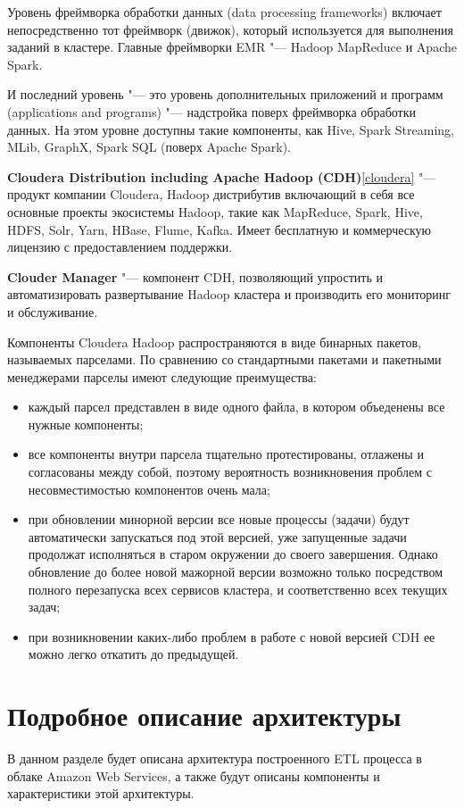 \documentclass[bachelor, och, pract]{SCWorks}
\begin{document}
Уровень фреймворка обработки данных (data processing frameworks) включает непосредственно тот фреймворк (движок), который используется для выполнения заданий в кластере. Главные фреймворки EMR "--- Hadoop MapReduce и Apache Spark.

И последний уровень "--- это уровень дополнительных приложений и программ (applications and programs) "--- надстройка поверх фреймворка обработки данных. На этом уровне доступны такие компоненты, как Hive, Spark Streaming, MLib, GraphX, Spark SQL (поверх Apache Spark).

\textbf{Cloudera Distribution including Apache Hadoop (CDH)}\ref{cloudera} "--- продукт компании Cloudera, Hadoop дистрибутив включающий в себя все основные проекты экосистемы Hadoop, такие как MapReduce, Spark, Hive, HDFS, Solr, Yarn, HBase, Flume, Kafka. Имеет бесплатную и коммерческую лицензию с предоставлением поддержки. 

\textbf{Clouder Manager} "--- компонент CDH, позволяющий упростить и автоматизировать развертывание Hadoop кластера и производить его мониторинг и обслуживание.

Компоненты Cloudera Hadoop распространяются в виде бинарных пакетов, называемых парселами. По сравнению со стандартными пакетами и пакетными менеджерами парселы имеют следующие преимущества:
\begin{itemize}
	\item каждый парсел представлен в виде одного файла, в котором объеденены все нужные компоненты;
	\item все компоненты внутри парсела тщательно протестированы, отлажены и согласованы между собой, поэтому вероятность возникновения проблем с несовместимостью компонентов очень мала;
	\item при обновлении минорной версии все новые процессы (задачи) будут автоматически запускаться под этой версией, уже запущенные задачи продолжат исполняться в старом окружении до своего завершения. Однако обновление до более новой мажорной версии возможно только посредством полного перезапуска всех сервисов кластера, и соответственно всех текущих задач;
	\item при возникновении каких-либо проблем в работе с новой версией CDH ее можно легко откатить до предыдущей.
\end{itemize}



\newpage
\section{Подробное описание архитектуры}
В данном разделе будет описана архитектура построенного ETL процесса в облаке Amazon Web Services, а также будут описаны компоненты и характеристики этой архитектуры.
\end{document}
